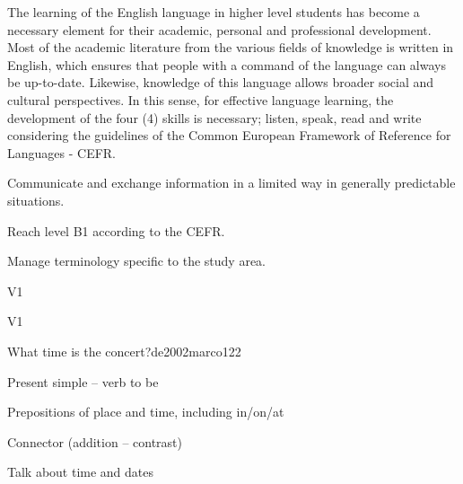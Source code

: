 \begin{syllabus}


\begin{justification}
The learning of the English language in higher level students has become a necessary element for their academic, personal and professional development. Most of the academic literature from the various fields of knowledge is written in English, which ensures that people with a command of the language can always be up-to-date. Likewise, knowledge of this language allows broader social and cultural perspectives. In this sense, for effective language learning, the development of the four (4) skills is necessary; listen, speak, read and write considering the guidelines of the Common European Framework of Reference for Languages - CEFR.
\end{justification}

\begin {goals}
\item Communicate and exchange information in a limited way in generally predictable situations.
\item Reach level B1 according to the CEFR.
\item Manage terminology specific to the study area.
\end{goals}

\begin{outcomes}{V1}
\item {}
\end{outcomes}

\begin{competences}{V1}
 \item {}
\end{competences}

\begin{unit}{What time is the concert?}{}{de2002marco}{12}{2}
   \begin{topics}
      \item Present simple – verb to be
      \item Prepositions of place and time, including in/on/at
      \item Connector (addition – contrast)
   \end{topics}

   \begin{learningoutcomes}
      \item Talk about time and dates
   \end{learningoutcomes}


\end{unit}
\end{syllabus}
